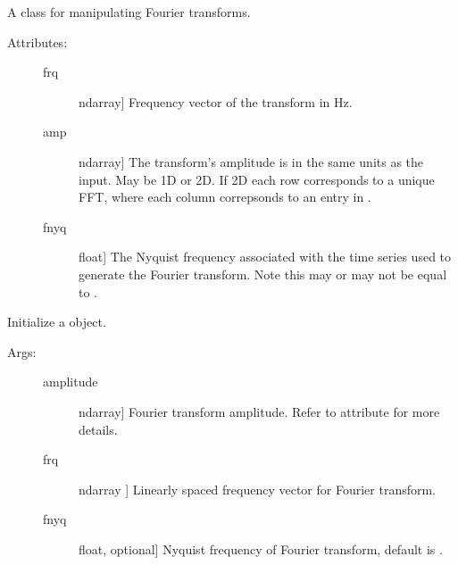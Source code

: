 \documentclass[letterpaper,10pt,english,openany,oneside]{sphinxmanual}
\begin{document}
\begin{fulllineitems}
\label{\detokenize{index:sigpropy.FourierTransform}}
A class for manipulating Fourier transforms.
\begin{description}
\item[{Attributes:}] \leavevmode\begin{description}
\item[{frq}] \leavevmode{[}ndarray{]}
Frequency vector of the transform in Hz.

\item[{amp}] \leavevmode{[}ndarray{]}
The transform’s amplitude is in the same units as the input.
May be 1D or 2D. If 2D each row corresponds to a unique FFT,
where each column correpsonds to an entry in .

\item[{fnyq}] \leavevmode{[}float{]}
The Nyquist frequency associated with the time series used
to generate the Fourier transform. Note this may or may not
be equal to .

\end{description}

\end{description}

\begin{fulllineitems}
\label{\detokenize{index:sigpropy.FourierTransform.__init__}}
Initialize a  object.
\begin{description}
\item[{Args:}] \leavevmode\begin{description}
\item[{amplitude}] \leavevmode{[}ndarray{]}
Fourier transform amplitude. Refer to attribute 
for more details.

\item[{frq}] \leavevmode{[}ndarray {]}
Linearly spaced frequency vector for Fourier transform.

\item[{fnyq}] \leavevmode{[}float, optional{]}
Nyquist frequency of Fourier transform, default is 
.


\end{description}
\end{description}
\end{fulllineitems}
\end{fulllineitems}
\end{document}
